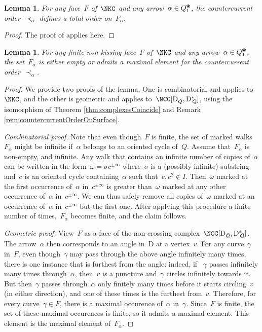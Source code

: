 \documentclass{amsart}
\newtheorem{lemma}[theorem]{Lemma}
\theoremstyle{definition}
\newcommand{\para}[1]{\medskip\noindent\textit{#1.}} %
\newcommand{\blossom}{^\text{\ding{96}}} %
\newcommand{\dual}{^*} %
\newcommand{\dissection}{\mathrm{D}} %
\begin{document}
\begin{lemma}
\label{lemm:countercurrentOrderIsTotal}
For any face~$F$ of~$\NKC$ and any arrow~$\alpha\in Q_1\blossom$, the countercurrent order~$\prec_\alpha$ defines a total order on~$F_{\alpha}$.
\end{lemma}

\begin{proof}
The proof of \cite[Lem.~2.21]{PaluPilaudPlamondon} applies here.
\end{proof}

\begin{lemma}
\label{lemm:facesHaveMaximalElement}
For any finite non-kissing face~$F$ of~$\NKC$ and any arrow~$\alpha\in Q_1\blossom$, the set~$F_\alpha$ is either empty or admits a maximal element for the countercurrent order~$\prec_\alpha$.
\end{lemma}

\begin{proof}
We provide two proofs of the lemma.  One is combinatorial and applies to~$\NKC$, and the other is geometric and applies to~$\NCC[\dissection_{\bar Q}, {\dissection\dual\!\!_{\bar Q}}]$, using the isomorphism of Theorem \ref{thm:complexesCoincide} and Remark \ref{rem:countercurrentOrderOnSurface}.

\para{Combinatorial proof}
Note that even though~$F$ is finite, the set of marked walks~$F_\alpha$ might be infinite if~$\alpha$ belongs to an oriented cycle of~$Q$.
Assume that~$F_\alpha$ is non-empty, and infinite.
Any walk that contains an infinite number of copies of~$\alpha$ can be written in the form~$\omega=\sigma c^{\pm\infty}$ where~$\sigma$ is a (possibly infinite) substring and~$c$ is an oriented cycle containing~$\alpha$ such that~$c, c^2\notin I$.
Then~$\omega$ marked at the first occurrence of~$\alpha$ in~$c^{\pm\infty}$ is greater than~$\omega$ marked at any other occurrence of~$\alpha$ in~$c^{\pm\infty}$.
We can thus safely remove all copies of~$\omega$ marked at an occurrence of~$\alpha$ in~$c^{\pm\infty}$ but the first one.
After applying this procedure a finite number of times,~$F_\alpha$ becomes finite, and the claim follows.

\para{Geometric proof}
View~$F$ as a face of the non-crossing complex~$\NCC[\dissection_{\bar Q}, {\dissection\dual\!\!_{\bar Q}}]$.
The arrow~$\alpha$ then corresponds to an angle in~$\dissection$ at a vertex~$v$.  
% 
For any curve~$\gamma$ in~$F$, even though~$\gamma$ may pass through the above angle infinitely many times, there is one instance that is furthest from the angle: indeed, if ~$\gamma$ passes infinitely many times through~$\alpha$, then~$v$ is a puncture and~$\gamma$ circles infinitely towards it.
But then~$\gamma$ passes through~$\alpha$ only finitely many times before it starts circling~$v$ (in either direction), and one of these times is the furthest from~$v$.
%  
Therefore, for every curve~$\gamma\in F$, there is a maximal occurence of~$\alpha$ in~$\gamma$.
Since~$F$ is finite, the set of these maximal occurences is finite, so it admits a maximal element.  
This element is the maximal element of~$F_\alpha$.
\end{proof}
\end{document}
